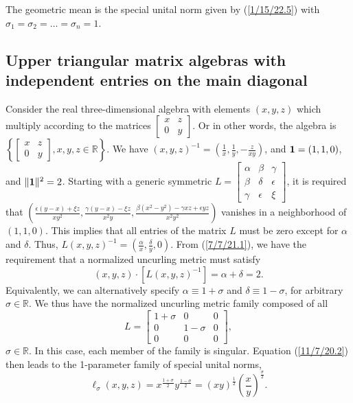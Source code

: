 \documentclass{amsart}
\numberwithin{equation}{section}
\theoremstyle{definition}
\numberwithin{theorem}{section}
\begin{document}
 The geometric mean is the special unital norm given by (\ref{1/15/22.5}) with $\sigma_1=\sigma_2=\dots =\sigma_n = 1$.  
   
 \subsection{Upper triangular matrix algebras with independent entries on the main diagonal} Consider the real three-dimensional algebra with elements $(x,y,z)$ which multiply according to the matrices 
$\left[
\begin{array}{ccc}
 x & z   \\
 0 & y    
\end{array}
\right]$.  Or in other words, the algebra is $\left\{ \left[
\begin{array}{ccc}
 x & z   \\
 0 & y    
\end{array}
\right],x,y,z\in\mathbb{R}\right\}$.  We have $(x,y,z)^{-1} = \left( \frac{1}{x}, \frac{1}{y}, -\frac{z}{xy} \right)$, and ${\bf 1}= (1,1,0)$, and $\|{\bf 1}\|^2 = 2$.  Starting with a generic symmetric $L = \left[
\begin{array}{ccc}
 \alpha & \beta & \gamma   \\
 \beta & \delta & \epsilon \\ \gamma & \epsilon & \xi    
\end{array}
\right]$, 
it is required that $\left( \frac{\epsilon(y-x)+\xi z}{xy^2}, \frac{\gamma(y-x)-\xi z}{x^2y}, \frac{\beta(x^2-y^2)-\gamma x z +\epsilon y z}{x^2y^2}\right)$ vanishes in a neighborhood of $(1,1,0)$.  This implies that all entries of the matrix $L$ must be zero except for $\alpha$ and $\delta$.   Thus, $L(x,y,z)^{-1} = (\frac{\alpha}{x}, \frac{\delta}{y},0)$.  From (\ref{7/7/21.1}), we have the requirement that a normalized uncurling metric must satisfy \[ (x,y,z)\cdot [L(x,y,z)^{-1}] = \alpha +\delta =  2.\]  Equivalently, we can alternatively specify $\alpha \equiv 1+\sigma$ and $\delta \equiv 1-\sigma$, for arbitrary $\sigma\in\mathbb{R}$.   We thus have the normalized uncurling metric family composed of all  \begin{equation}\label{11/17/22.2} L = \left[
\begin{array}{ccc}
 1+\sigma & 0 & 0   \\
 0 & 1-\sigma & 0 \\ 0 & 0 & 0    
\end{array}
\right],\end{equation} $\sigma\in\mathbb{R}$.  In this case, each member of the family is singular.  Equation (\ref{11/7/20.2}) then leads to the 1-parameter family of special unital norms, \begin{equation}\label{12/21/21.1} \ell_\sigma(x,y,z) = x^\frac{1+\sigma}{2} y^\frac{1-\sigma}{2} = (xy)^{\frac{1}{2}}\left(\frac{x}{y}\right)^{\frac{\sigma}{2}}.\end{equation} 
\end{document}
